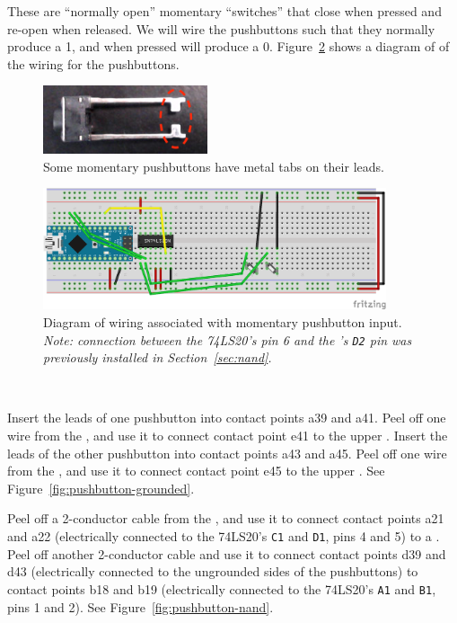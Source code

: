 These are ``normally open'' momentary ``switches'' that close when pressed and
re-open when released. We will wire the pushbuttons such that they normally
produce a 1, and when pressed will produce a 0.
Figure~\ref{fig:pushbutton-diagram} shows a diagram of of the wiring for the
pushbuttons.

\begin{figure}
    \centering
    \includegraphics[height=2cm]{pushbutton-tabs}
    \caption{Some momentary pushbuttons have metal tabs on their leads.\label{fig:pushbutton-tabs}}
\end{figure}

\begin{figure}
    \centering
    \includegraphics[width=0.9\textwidth]{fritzing_images/pushbutton}
    \caption{Diagram of wiring associated with momentary pushbutton input.
        \textit{Note: connection between the 74LS20's pin 6 and the \nano's
        \texttt{D2} pin was previously installed in Section~\ref{sec:nand}.}
        \label{fig:pushbutton-diagram}}
\end{figure}

\disconnect\

Insert the leads of one pushbutton into contact points a39 and a41. Peel off
one wire from the \rainbow, and use it to connect contact point e41 to the
upper \ground. Insert the leads of the other pushbutton into contact points a43
and a45. Peel off one wire from the \rainbow, and use it to connect contact
point e45 to the upper \ground. See Figure~\ref{fig:pushbutton-grounded}.

Peel off a 2-conductor cable from the \rainbow, and use it to connect contact
points a21 and a22 (electrically connected to the 74LS20's \texttt{C1} and
\texttt{D1}, pins 4 and 5) to a \power. Peel off another 2-conductor cable and
use it to connect contact points d39 and d43 (electrically connected to the
ungrounded sides of the pushbuttons) to contact points b18 and b19
(electrically connected to the 74LS20's \texttt{A1} and \texttt{B1}, pins 1 and
2). See Figure~\ref{fig:pushbutton-nand}.

